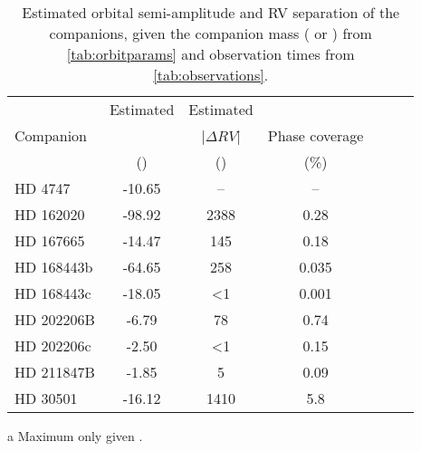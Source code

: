 \begin{table*}
    \small
    \centering
    \begin{threeparttable}[b]
        \caption[Semi-amplitude and RV separation of companions.]{Estimated orbital semi-amplitude and {RV} separation of the companions, given the companion mass (\Mtwo{} or \Mtwosini{}) from \cref{tab:orbitparams} and observation times from \cref{tab:observations}.}
        \begin{tabular}{l c c c c c c}%
            \toprule
             & Estimated & Estimated & & \\  %
             Companion & \Ktwo{} & |\(\Delta {RV}\)| & Phase coverage\\
             & (\kmps{}) & (\mps{}) & (\%)\\
             \midrule
             {HD 4747} & -10.65 & -- & --\\  %
             {HD 162020} & -98.92\tnote{a} & 2388 & 0.28\\  %
             {HD 167665} & -14.47\tnote{a} & 145 & 0.18\\  %
             {HD 168443b} & -64.65\tnote{a} & 258 & 0.035\\
             {HD 168443c} & -18.05\tnote{a} & <1 & 0.001\\  %
             {HD 202206}B & -6.79 & 78 & 0.74\\  %
             {HD 202206}c & -2.50 & <1 & 0.15\\  %
             {HD 211847}B & -1.85 & 5 & 0.09\\  %
             {HD 30501} & -16.12 & 1410 & 5.8\\
             \bottomrule
         \end{tabular}\label{tab:estimated_rv}
         \begin{tablenotes}
            \item[a] {Maximum \Ktwo{} only given \Mtwosini.}
         \end{tablenotes}
    \end{threeparttable}
\end{table*}
